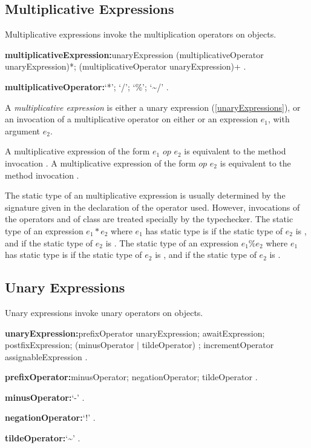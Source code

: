 \documentclass{article}
\begin{document}
\subsection{Multiplicative Expressions}

\LMHash{}
Multiplicative expressions invoke the multiplication operators on objects.

\begin{grammar}
{\bf multiplicativeExpression:}unaryExpression (multiplicativeOperator unaryExpression)*;
  \SUPER{} (multiplicativeOperator unaryExpression)+
  .

{\bf multiplicativeOperator:}`*';
  `/';
  `\%';
  `\~{}/'
  .
\end{grammar}

\LMHash{}
 A {\em multiplicative expression} is either a unary expression (\ref{unaryExpressions}), or an invocation of a multiplicative operator on either \SUPER{} or an expression $e_1$, with argument $e_2$.

\LMHash{}
A multiplicative expression of the form $e_1$ $op$ $e_2$ is equivalent to the method invocation .
A multiplicative expression of the form \SUPER{} $op$ $e_2$ is equivalent to the method invocation .

\LMHash{}
The static type of an multiplicative expression is usually determined by the signature given in the declaration of the operator used.
However, invocations of the operators \code{*} and \code{\%} of class  are treated specially by the typechecker.
The static type of an expression $e_1 * e_2$ where $e_1$ has static type  is  if the static type of $e_2$ is , and  if the static type of $e_2$ is .
The static type of an expression $e_1 \% e_2$ where $e_1$ has static type  is  if the static type of $e_2$ is , and  if the static type of $e_2$ is .

\subsection{Unary Expressions}

\LMHash{}
Unary expressions invoke unary operators on objects.

\begin{grammar}
{\bf unaryExpression:}prefixOperator unaryExpression;
  awaitExpression;
  postfixExpression;
  (minusOperator $|$ tildeOperator) \SUPER{};
  incrementOperator assignableExpression
  .

{\bf prefixOperator:}minusOperator;
  negationOperator;
  tildeOperator
  .

{\bf minusOperator:}`-'
  .

{\bf negationOperator:}`!'
  .

{\bf tildeOperator:}`\~{}'
  .
\end{grammar}
\end{document}
